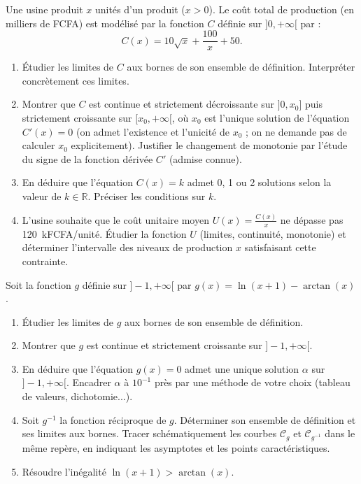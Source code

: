 \documentclass[11pt]{article}
\begin{document}
\begin{exercice}
Une usine produit $x$ unités d'un produit ($x > 0$). Le coût total de production (en milliers de FCFA) est modélisé par la fonction $C$ définie sur $]0, +\infty[$ par :
\[
C(x) = 10\sqrt{x} + \frac{100}{x} + 50.
\]
\begin{enumerate}
    \item Étudier les limites de $C$ aux bornes de son ensemble de définition. Interpréter concrètement ces limites.
    \item Montrer que $C$ est continue et strictement décroissante sur $]0, x_0]$ puis strictement croissante sur $[x_0, +\infty[$, où $x_0$ est l'unique solution de l'équation $C'(x) = 0$ (on admet l'existence et l'unicité de $x_0$ ; on ne demande pas de calculer $x_0$ explicitement). Justifier le changement de monotonie par l'étude du signe de la fonction dérivée $C'$ (admise connue).
    \item En déduire que l'équation $C(x) = k$ admet 0, 1 ou 2 solutions selon la valeur de $k \in \mathbb{R}$. Préciser les conditions sur $k$.
    \item L'usine souhaite que le coût unitaire moyen $U(x) = \frac{C(x)}{x}$ ne dépasse pas \SI{120}{kFCFA/unité}. Étudier la fonction $U$ (limites, continuité, monotonie) et déterminer l'intervalle des niveaux de production $x$ satisfaisant cette contrainte.
\end{enumerate}
\end{exercice}

\begin{exercice}
Soit la fonction $g$ définie sur $]-1, +\infty[$ par $g(x) = \ln(x+1) - \arctan(x)$.
\begin{enumerate}
    \item Étudier les limites de $g$ aux bornes de son ensemble de définition.
    \item Montrer que $g$ est continue et strictement croissante sur $]-1, +\infty[$.
    \item En déduire que l'équation $g(x) = 0$ admet une unique solution $\alpha$ sur $]-1, +\infty[$. Encadrer $\alpha$ à $10^{-1}$ près par une méthode de votre choix (tableau de valeurs, dichotomie...).
    \item Soit $g^{-1}$ la fonction réciproque de $g$. Déterminer son ensemble de définition et ses limites aux bornes. Tracer schématiquement les courbes $\mathcal{C}_g$ et $\mathcal{C}_{g^{-1}}$ dans le même repère, en indiquant les asymptotes et les points caractéristiques.
    \item Résoudre l'inégalité $\ln(x+1) > \arctan(x)$.
\end{enumerate}
\end{exercice}
\end{document}

